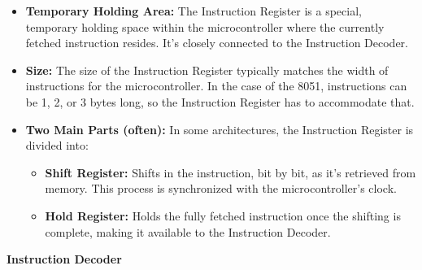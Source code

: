 \documentclass[
]{article}
\begin{document}
\begin{itemize}
\item
  \textbf{Temporary Holding Area:} The Instruction Register is a
  special, temporary holding space within the microcontroller where the
  currently fetched instruction resides. It's closely connected to the
  Instruction Decoder.
\item
  \textbf{Size:} The size of the Instruction Register typically matches
  the width of instructions for the microcontroller. In the case of the
  8051, instructions can be 1, 2, or 3 bytes long, so the Instruction
  Register has to accommodate that.
\item
  \textbf{Two Main Parts (often):} In some architectures, the
  Instruction Register is divided into:

  \begin{itemize}
  \item
    \textbf{Shift Register:} Shifts in the instruction, bit by bit, as
    it's retrieved from memory. This process is synchronized with the
    microcontroller's clock.
  \item
    \textbf{Hold Register:} Holds the fully fetched instruction once the
    shifting is complete, making it available to the Instruction
    Decoder.
  \end{itemize}
\end{itemize}

\textbf{Instruction Decoder}
\end{document}
